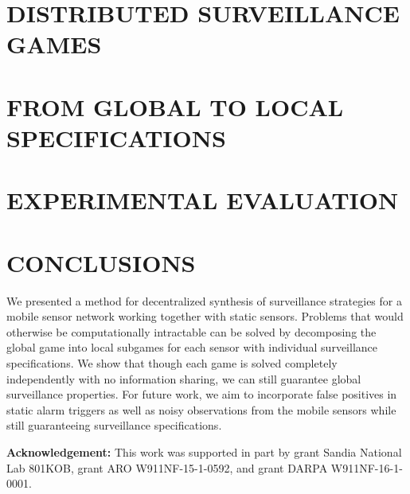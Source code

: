 \documentclass[letterpaper, 10 pt, conference]{ieeeconf}  %
\begin{document}



\section{DISTRIBUTED SURVEILLANCE GAMES}


\section{FROM GLOBAL TO LOCAL SPECIFICATIONS}

%
%

\section{EXPERIMENTAL EVALUATION}\label{sec:experiments}



\section{CONCLUSIONS}
We presented a method for decentralized synthesis of surveillance strategies for a mobile sensor network working together with static sensors. Problems that would otherwise be computationally intractable can be solved by decomposing the global game into local subgames for each sensor with individual surveillance specifications. We show that though each game is solved completely independently with no information sharing, we can still guarantee global surveillance properties.
For future work, we aim to incorporate false positives in static alarm triggers as well as noisy observations from the mobile sensors while still guaranteeing surveillance specifications.

{\bf Acknowledgement:} This work was supported in part by grant Sandia National Lab 801KOB, grant ARO W911NF-15-1-0592,  and grant DARPA W911NF-16-1-0001.









\end{document}
